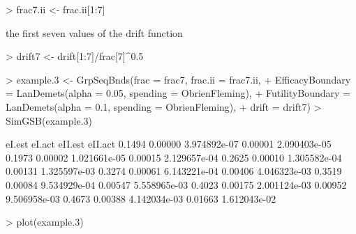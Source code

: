 \documentclass{article}
\begin{document}
\begin{itemize}
{\begin{Schunk}
\begin{Sinput}
> frac7.ii <- frac.ii[1:7]
\end{Sinput}
\end{Schunk}

    the first seven values of the drift function

\begin{Schunk}
\begin{Sinput}
> drift7 <- drift[1:7]/frac[7]^0.5
\end{Sinput}
\end{Schunk}

\begin{Schunk}
\begin{Sinput}
> example.3 <- GrpSeqBnds(frac = frac7, frac.ii = frac7.ii, 
+     EfficacyBoundary = LanDemets(alpha = 0.05, spending = ObrienFleming), 
+     FutilityBoundary = LanDemets(alpha = 0.1, spending = ObrienFleming), 
+     drift = drift7)
> SimGSB(example.3)
\end{Sinput}
\begin{Soutput}
        eI.est       eI.act eII.est      eII.act
0.1494 0.00000 3.974892e-07 0.00001 2.090403e-05
0.1973 0.00002 1.021661e-05 0.00015 2.129657e-04
0.2625 0.00010 1.305582e-04 0.00131 1.325597e-03
0.3274 0.00061 6.143221e-04 0.00406 4.046323e-03
0.3519 0.00084 9.534929e-04 0.00547 5.558965e-03
0.4023 0.00175 2.001124e-03 0.00952 9.506958e-03
0.4673 0.00388 4.142034e-03 0.01663 1.612043e-02
\end{Soutput}
\end{Schunk}

\begin{Schunk}
\begin{Sinput}
> plot(example.3)
\end{Sinput}
\end{Schunk}
  }
  

\end{itemize}
\end{document}
